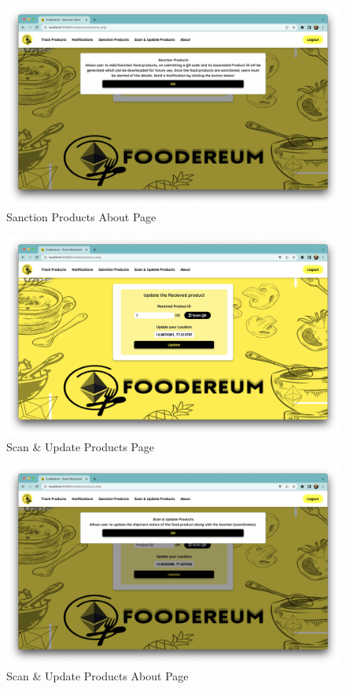 \documentclass[12pt,a4paper,twocolumn,fleqn]{article}
\begin{document}
\begin{figure} [H]
\includegraphics[width=15cm]{media/Sanction_About.png}
\centering
\caption{Sanction Products About Page}
\end{figure}
\begin{figure} [H]
\includegraphics[width=15cm]{media/Scan.png}
\centering
\caption{Scan \& Update Products Page}
\end{figure}
\begin{figure} [H]
\includegraphics[width=15cm]{media/Scan_About.png}
\centering
\caption{Scan \& Update Products About Page}
\end{figure}
\end{document}
